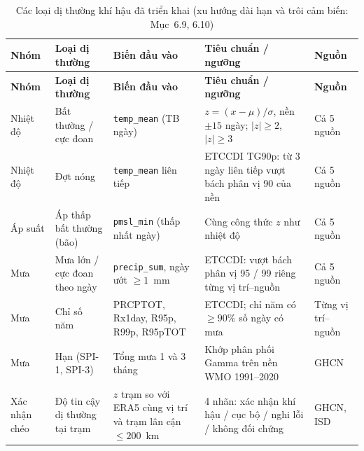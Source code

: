 \documentclass[12pt,a4paper]{report}
\begin{document}
{\footnotesize
\begin{longtable}{@{}L{1.3cm}L{2.7cm}L{3.0cm}L{4.4cm}L{2.4cm}@{}}
\caption[Các loại dị thường khí hậu đã triển khai]{Các loại dị thường khí hậu đã triển khai (xu hướng dài hạn và trôi cảm biến: Mục~6.9, 6.10)}
\label{tab:anomaly-standards} \\
\toprule
\textbf{Nhóm} & \textbf{Loại dị thường} & \textbf{Biến đầu vào} & \textbf{Tiêu chuẩn / ngưỡng} & \textbf{Nguồn} \\
\midrule
\endfirsthead
\toprule
\textbf{Nhóm} & \textbf{Loại dị thường} & \textbf{Biến đầu vào} & \textbf{Tiêu chuẩn / ngưỡng} & \textbf{Nguồn} \\
\midrule
\endhead
\bottomrule
\endfoot
Nhiệt độ & Bất thường / cực đoan & \texttt{temp\_mean} (TB ngày) &
$z=(x-\mu)/\sigma$, nền $\pm15$ ngày; $|z|\ge2$, $|z|\ge3$ & Cả 5 nguồn \\
Nhiệt độ & Đợt nóng & \texttt{temp\_mean} liên tiếp & ETCCDI TG90p: từ 3 ngày liên tiếp vượt bách phân vị 90 của nền & Cả 5 nguồn \\
Áp suất & Áp thấp bất thường (bão) & \texttt{pmsl\_min} (thấp nhất ngày) & Cùng công thức $z$ như nhiệt độ & Cả 5 nguồn \\
Mưa & Mưa lớn / cực đoan theo ngày & \texttt{precip\_sum}, ngày ướt $\ge1$~mm & ETCCDI: vượt bách phân vị 95 / 99 riêng từng vị trí--nguồn & Cả 5 nguồn \\
Mưa & Chỉ số năm & PRCPTOT, Rx1day, R95p, R99p, R95pTOT & ETCCDI; chỉ năm có $\ge90\%$ số ngày có mưa & Từng vị trí--nguồn \\
Mưa & Hạn (SPI-1, SPI-3) & Tổng mưa 1 và 3 tháng & Khớp phân phối Gamma trên nền WMO 1991--2020 & GHCN \\
Xác nhận chéo & Độ tin cậy dị thường tại trạm & $z$ trạm so với ERA5 cùng vị trí và trạm lân cận $\le200$~km &
4 nhãn: xác nhận khí hậu / cục bộ / nghi lỗi / không đối chứng & GHCN, ISD \\
\end{longtable}
}
\end{document}
